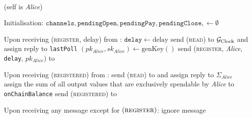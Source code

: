 \ \\  (self is \textit{Alice})
  \label{alg:lightningprot}
  \begin{algorithmic}[1]
    \State Initialisation:
    \Indent
      \State $\mathtt{channels}, \mathtt{pendingOpen}, \mathtt{pendingPay},
      \mathtt{pendingClose}, \gets \emptyset$
    \EndIndent
    \State

    \State Upon receiving (\textsc{register}, delay) from \environment:
    \Indent
      \State $\mathtt{delay} \gets \mathrm{delay}$
      \State send (\textsc{read}) to $\mathcal{G}_{\mathrm{Clock}}$ and assign reply to
      \texttt{lastPoll}
      \State $\left(pk_{\mathit{Alice}}, sk_{\mathit{Alice}}\right) \gets
      \mathrm{genKey}\left(\right)$
      \State send (\textsc{register}, \textit{Alice}, \texttt{delay},
      $pk_{\mathit{Alice}}$) to \adversary {}
    \EndIndent
    \State

    \State Upon receiving (\textsc{registered}) from \adversary:
    \Indent
      \State send (\textsc{read}) to \ledger{} and assign reply to
      $\Sigma_{\mathit{Alice}}$
      \State assign the sum of all output values that are exclusively spendable
      by \textit{Alice} to \texttt{onChainBalance}
      \State send (\textsc{registered}) to \environment
    \EndIndent
    \State

    \State Upon receiving any message except for
    $\left(\textsc{register}\right)$:
    \Indent
        \State ignore message
      \EndIf
    \EndIndent
    \State


\end{algorithmic}
